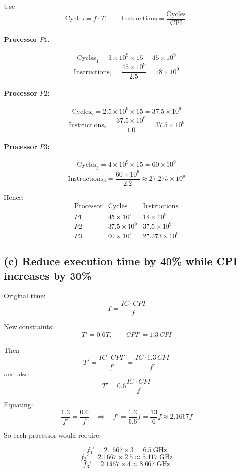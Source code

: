 \documentclass[12pt,a4paper]{article}
\begin{document}
Use
\[
\text{Cycles} = f \cdot T,\qquad
\text{Instructions} = \frac{\text{Cycles}}{\text{CPI}}.
\]

\paragraph{Processor \(P1\):}
\[
\text{Cycles}_1 = 3\times 10^9 \times 15 = 45\times 10^9
\]
\[
\text{Instructions}_1=\frac{45\times 10^9}{2.5}=18\times 10^9
\]

\paragraph{Processor \(P2\):}
\[
\text{Cycles}_2 = 2.5\times 10^9 \times 15 = 37.5\times 10^9
\]
\[
\text{Instructions}_2=\frac{37.5\times 10^9}{1.0}=37.5\times 10^9
\]

\paragraph{Processor \(P3\):}
\[
\text{Cycles}_3 = 4\times 10^9 \times 15 = 60\times 10^9
\]
\[
\text{Instructions}_3=\frac{60\times 10^9}{2.2}\approx 27.273\times 10^9
\]

Hence:
\[
\boxed{
\begin{array}{c|c|c}
\text{Processor} & \text{Cycles} & \text{Instructions} \\
\hline
P1 & 45\times 10^9 & 18\times 10^9 \\
P2 & 37.5\times 10^9 & 37.5\times 10^9 \\
P3 & 60\times 10^9 & 27.273\times 10^9
\end{array}}
\]

\subsection*{(c) Reduce execution time by 40\% while CPI increases by 30\%}

Original time:
\[
T=\frac{IC\cdot CPI}{f}
\]

New constraints:
\[
T' = 0.6T,\qquad CPI' = 1.3\,CPI
\]

Then
\[
T'=\frac{IC\cdot CPI'}{f'}=\frac{IC\cdot 1.3\,CPI}{f'}
\]
and also
\[
T' = 0.6\frac{IC\cdot CPI}{f}
\]

Equating:
\[
\frac{1.3}{f'}=\frac{0.6}{f}
\quad\Rightarrow\quad
f'=\frac{1.3}{0.6}f=\frac{13}{6}f\approx 2.1667f
\]

So each processor would require:

\[
f_1' = 2.1667 \times 3 = 6.5~\text{GHz}
\]
\[
f_2' = 2.1667 \times 2.5 \approx 5.417~\text{GHz}
\]
\[
f_3' = 2.1667 \times 4 \approx 8.667~\text{GHz}
\]
\end{document}
